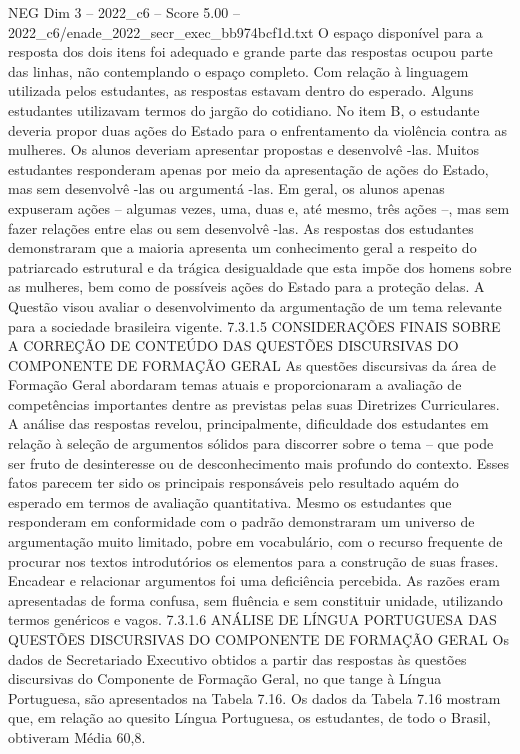 \begin{textsample}{NEG Dim 3 – 2022\_c6 – Score 5.00 – 2022\_c6/enade\_2022\_secr\_exec\_bb974bcf1d.txt}
O espaço disponível para a resposta dos dois itens foi adequado e grande parte das respostas ocupou parte das linhas, não contemplando o espaço completo.
Com relação à linguagem utilizada pelos estudantes, as respostas estavam dentro do esperado.
Alguns estudantes utilizavam termos do jargão do cotidiano.
No item B, o estudante deveria propor duas ações do Estado para o enfrentamento da violência contra as mulheres.
Os alunos deveriam apresentar propostas e desenvolvê -las.
Muitos estudantes responderam apenas por meio da apresentação de ações do Estado, mas sem desenvolvê -las ou argumentá -las.
Em geral, os alunos apenas expuseram ações – algumas vezes, uma, duas e, até mesmo, três ações –, mas sem fazer relações entre elas ou sem desenvolvê -las.
As respostas dos estudantes demonstraram que a maioria apresenta um conhecimento geral a respeito do patriarcado estrutural e da trágica desigualdade que esta impõe dos homens sobre as mulheres, bem como de possíveis ações do Estado para a proteção delas.
A Questão visou avaliar o desenvolvimento da argumentação de um tema relevante para a sociedade brasileira vigente. 7.3.1.5 CONSIDERAÇÕES FINAIS SOBRE A CORREÇÃO DE CONTEÚDO DAS QUESTÕES DISCURSIVAS DO COMPONENTE DE FORMAÇÃO GERAL As questões discursivas da área de Formação Geral abordaram temas atuais e proporcionaram a avaliação de competências importantes dentre as previstas pelas suas Diretrizes Curriculares.
A análise das respostas revelou, principalmente, dificuldade dos estudantes em relação à seleção de argumentos sólidos para discorrer sobre o tema – que pode ser fruto de desinteresse ou de desconhecimento mais profundo do contexto.
Esses fatos parecem ter sido os principais responsáveis pelo resultado aquém do esperado em termos de avaliação quantitativa.
Mesmo os estudantes que responderam em conformidade com o padrão demonstraram um universo de argumentação muito limitado, pobre em vocabulário, com o recurso frequente de procurar nos textos introdutórios os elementos para a construção de suas frases.
Encadear e relacionar argumentos foi uma deficiência percebida.
As razões eram apresentadas de forma confusa, sem fluência e sem constituir unidade, utilizando termos genéricos e vagos. 7.3.1.6 ANÁLISE DE LÍNGUA PORTUGUESA DAS QUESTÕES DISCURSIVAS DO COMPONENTE DE FORMAÇÃO GERAL Os dados de Secretariado Executivo obtidos a partir das respostas às questões discursivas do Componente de Formação Geral, no que tange à Língua Portuguesa, são apresentados na Tabela 7.16.
Os dados da Tabela 7.16 mostram que, em relação ao quesito Língua Portuguesa, os estudantes, de todo o Brasil, obtiveram Média 60,8.

\end{textsample}
